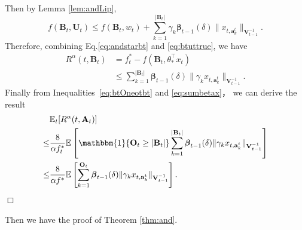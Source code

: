 \documentclass{article}
\newcommand{\bbeta}{\boldsymbol{\beta}}
\newcommand{\EE}{\mathbb{E}}
\newcommand{\bOne}{\mathbbm{1}}
\newcommand{\bA}{\mathbf{A}}
\newcommand{\ba}{\mathbf{a}}
\newcommand{\bB}{\mathbf{B}}
\newcommand{\bO}{\mathbf{O}}
\newcommand{\bU}{\mathbf{U}}
\newcommand{\bV}{\mathbf{V}}
\newcommand{\abs}[1]{\left| #1 \right|}
\newcommand{\norm}[1]{\| #1 \|}
\newenvironment{proof}{\noindent {\textbf{Proof. }}}{$\Box$ \medskip}
\begin{document}
\begin{proof}
	Then by Lemma \ref{lem:andLip},
	\begin{equation} 
		\label{eq:btuttrue}
		f(\bB_t,\bU_t) \leq f(\bB_t, w_t) + \sum_{k=1}^{\abs{\bB_t}}\gamma_k\bbeta_{t-1}(\delta)\norm{x_{t,\ba_k^t}}_{\bV_{t-1}^{-1}}.
	\end{equation}
	Therefore, combining Eq.\eqref{eq:andstarbt} and \eqref{eq:btuttrue}, we have
	\begin{align}
		R^{\alpha}(t, \bB_t) & = f_{t}^{\ast} - f(\bB_t, \theta_{\ast}^{\top}x_t) \nonumber \\
		& \leq \sum_{k=1}^{\abs{\bB_t}}\bbeta_{t-1}(\delta)\norm{\gamma_k x_{t,\ba_k^t}}_{\bV_{t-1}^{-1}}. \label{eq:sumbetax}
	\end{align}
	Finally from Inequalities~\eqref{eq:btOneotbt} and \eqref{eq:sumbetax}， we can derive the result
	\begin{align*}
		&\EE_t[R^{\alpha}(t, \bA_t)] \\
		\leq& \frac{8}{\alpha f_{t}^*} \EE \left[\bOne\{ \bO_t \geq \abs{\bB_t} \}\sum_{k=1}^{\abs{\bB_t}}\bbeta_{t-1}(\delta)\norm{\gamma_k x_{t,\ba_k^t}}_{\bV_{t-1}^{-1}} \right]\\
		\leq& \frac{8}{\alpha f^*} \EE \left[ \sum_{k=1}^{ \bO_t } \bbeta_{t-1}(\delta) \norm{\gamma_k x_{t,\ba_k^t}}_{\bV_{t-1}^{-1}} \right].
	\end{align*}
\end{proof}

Then we have the proof of Theorem \ref{thm:and}.
\end{document}
